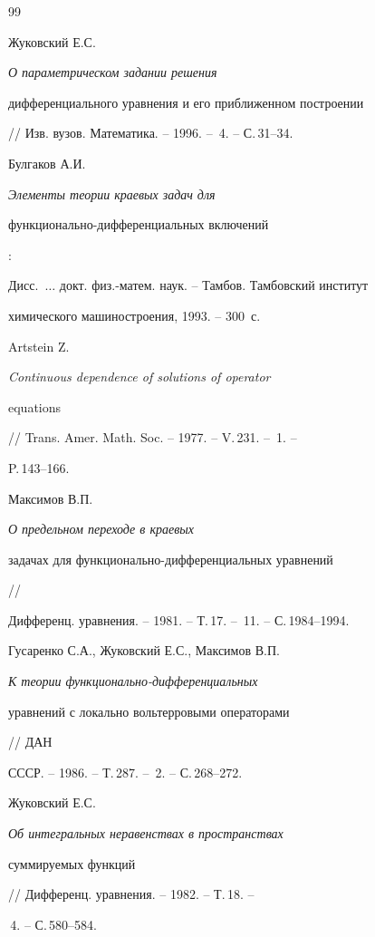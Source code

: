 \begin{thebibliography}{99}


Жуковский Е.С. {\em О параметрическом задании решения


дифференциального уравнения и его приближенном построении}


// Изв. вузов. Математика. -- 1996. -- \No\,4. -- С.\,31--34.




Булгаков А.И. {\em Элементы теории краевых задач для


функционально-дифференциальных включений}:


Дисс.~$\dotsc$ докт. физ.-матем. наук. -- Тамбов. Тамбовский институт


химического машиностроения, 1993. -- 300~с.




Artstein Z. {\em Continuous dependence of solutions of operator


equations} // Trans. Amer. Math. Soc. -- 1977. -- V.\,231. -- \No\,1. -- 


P.\,143--166.




Максимов В.П. {\em О предельном переходе в краевых


задачах для функционально-диф\-фе\-рен\-ци\-аль\-ных уравнений} //


Дифференц. уравнения. -- 1981. -- Т.\,17. -- \No\,11. -- С.\,1984--1994.




Гусаренко С.А., Жуковский Е.С., Максимов В.П.


{\em К теории функционально-диф\-фе\-рен\-ци\-аль\-ных


уравнений с локально вольтерровыми операторами} // ДАН


СССР. -- 1986. -- Т.\,287. -- \No\,2. -- С.\,268--272.




Жуковский Е.С. {\em Об интегральных неравенствах в пространствах


суммируемых функций} // Дифференц. уравнения. -- 1982. -- Т.\,18. --


\No\,4. -- С.\,580--584.








\end{thebibliography}





\vskip 2cm





